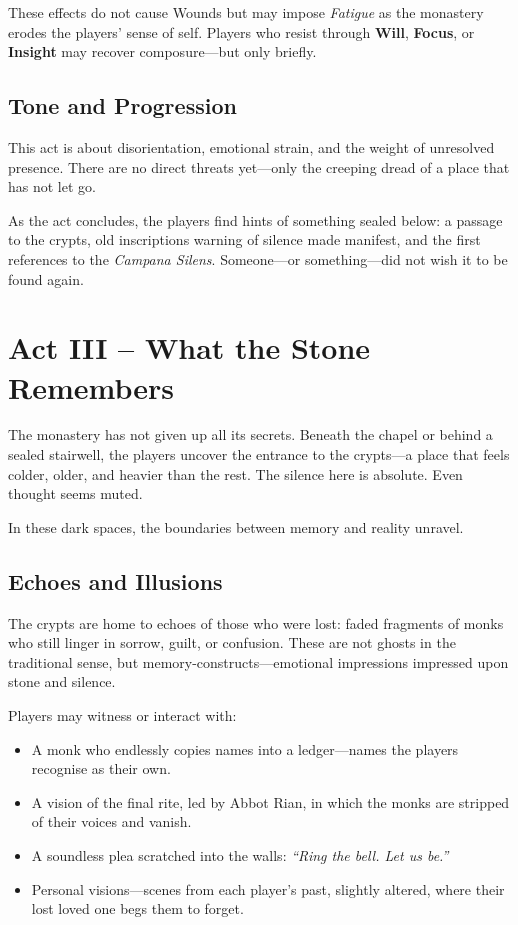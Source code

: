 \documentclass[nodeprecatedcode,bg=print]{dndbook/dndbook}
\begin{document}
These effects do not cause Wounds but may impose \emph{Fatigue} as the monastery erodes the players' sense of self. Players who resist through \textbf{Will}, \textbf{Focus}, or \textbf{Insight} may recover composure—but only briefly.

\subsection{Tone and Progression}

This act is about disorientation, emotional strain, and the weight of unresolved presence. There are no direct threats yet—only the creeping dread of a place that has not let go.

As the act concludes, the players find hints of something sealed below: a passage to the crypts, old inscriptions warning of silence made manifest, and the first references to the \emph{Campana Silens}. Someone—or something—did not wish it to be found again.

\section*{Act III – What the Stone Remembers}

The monastery has not given up all its secrets. Beneath the chapel or behind a sealed stairwell, the players uncover the entrance to the crypts—a place that feels colder, older, and heavier than the rest. The silence here is absolute. Even thought seems muted.

In these dark spaces, the boundaries between memory and reality unravel.

\subsection{Echoes and Illusions}

The crypts are home to echoes of those who were lost: faded fragments of monks who still linger in sorrow, guilt, or confusion. These are not ghosts in the traditional sense, but memory-constructs—emotional impressions impressed upon stone and silence.

Players may witness or interact with:
\begin{itemize}
    \item A monk who endlessly copies names into a ledger—names the players recognise as their own.
    \item A vision of the final rite, led by Abbot Rian, in which the monks are stripped of their voices and vanish.
    \item A soundless plea scratched into the walls: \emph{“Ring the bell. Let us be.”}
    \item Personal visions—scenes from each player’s past, slightly altered, where their lost loved one begs them to forget.
\end{itemize}
\end{document}
